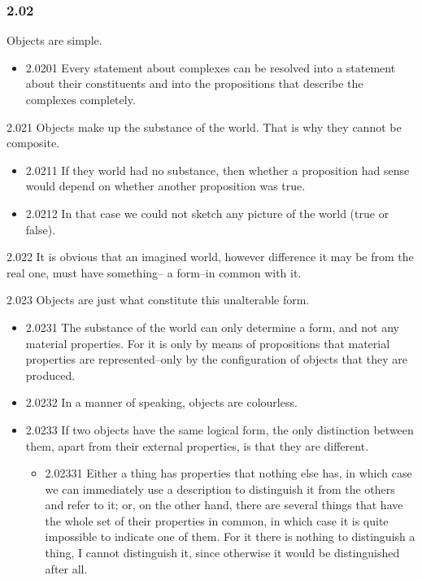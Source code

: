 \documentclass[11pt]{article}
\begin{document}
\subsubsection*{2.02}
\label{sec:org2de9ffa}
Objects are simple.
\begin{itemize}
\item 2.0201
\label{sec:orgce8bb94}
Every statement about complexes can be resolved into a statement
about their constituents and into the propositions that describe the
complexes completely.
\end{itemize}
\item 2.021
\label{sec:org0560956}
Objects make up the substance of the world. That is why they cannot
be composite.
\begin{itemize}
\item 2.0211
\label{sec:org7a7fbaa}
If they world had no substance, then whether a proposition had sense
would depend on whether another proposition was true.
\item 2.0212
\label{sec:org2ef7d73}
In that case we could not sketch any picture of the world (true or
false).
\end{itemize}
\item 2.022
\label{sec:org1de305a}
It is obvious that an imagined world, however difference it may be
from the real one, must have something-- a form--in common with it.
\item 2.023
\label{sec:org3cb3b7c}
Objects are just what constitute this unalterable form.
\begin{itemize}
\item 2.0231
\label{sec:orgd3adf0e}
The substance of the world can only determine a form, and not any
material properties. For it is only by means of propositions that material
properties are represented--only by the configuration of objects that they
are produced.
\item 2.0232
\label{sec:org0c1fa2e}
In a manner of speaking, objects are colourless.
\item 2.0233
\label{sec:org726607e}
If two objects have the same logical form, the only distinction
between them, apart from their external properties, is that they are
different.
\begin{itemize}
\item 2.02331
\label{sec:org81ecd28}
Either a thing has properties that nothing else has, in which case
we can immediately use a description to distinguish it from the others and
refer to it; or, on the other hand, there are several things that have the
whole set of their properties in common, in which case it is quite
impossible to indicate one of them. For it there is nothing to distinguish
a thing, I cannot distinguish it, since otherwise it would be distinguished
after all.
\end{itemize}
\end{itemize}
\end{document}
